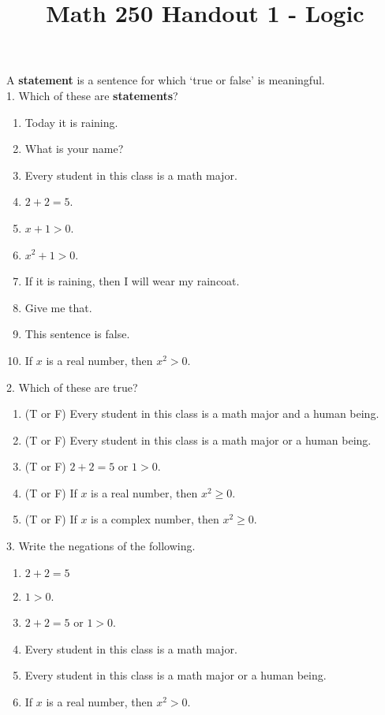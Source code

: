 \documentclass[12pt, reqno]{amsart}
\begin{document}
\title[Math 250 Handout 1 - Logic]{Math 250 Handout 1 - Logic}\maketitle


A \textbf{statement} is a sentence for which `true or false' is meaningful.
\\

1. Which of these are \textbf{statements}? 
\vspace{10pt}
\begin{enumerate}
\item Today it is raining.
\item What is your name?
\item Every student in this class is a math major.
\item $2 + 2 = 5$.
\item $x + 1  > 0$.
\item $x^2 + 1  > 0$.
\item If it is raining, then I will wear my raincoat.
\item Give me that.
\item This sentence is false.
\item If $x$ is a real number, then $x^2 > 0$.
\end{enumerate}
\vspace{20pt}

2. Which of these are true? 
\vspace{10pt}
\begin{enumerate}
\item (T or F) Every student in this class is a math major and a human being.
\item (T or F) Every student in this class is a math major or a human being.
\item (T or F) $2 + 2 = 5$ or  $1  > 0$.
\item (T or F) If $x$ is a real number, then $x^2 \geq 0$.
\item (T or F) If $x$ is a complex number, then $x^2 \geq 0$.
\end{enumerate}
\vspace{20pt}

3. Write the negations of the following.
\vspace{10pt}
\begin{enumerate}
\item $2 + 2 = 5$
\item $1  > 0$.
\item $2 + 2 = 5$ or  $1  > 0$.
\item Every student in this class is a math major.
\item Every student in this class is a math major or a human being.
\item If $x$ is a real number, then $x^2 > 0$.
\end{enumerate}
\vspace{20pt}
\end{document}
